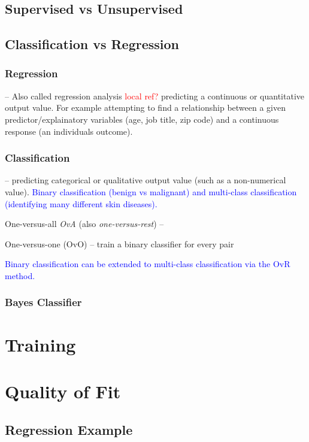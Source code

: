 \subsection{Supervised vs Unsupervised}

\subsection{Classification vs Regression}

\subsubsection{Regression} -- Also called regression analysis \textcolor{red}{local ref?} predicting a continuous or quantitative output value. For example attempting to find a relationship between a given predictor/explainatory variables (age, job title, zip code) and a continuous response (an individuals outcome).

\subsubsection{Classification} -- predicting categorical or qualitative output value (such as a non-numerical value). \textcolor{blue}{Binary classification (benign vs malignant) and multi-class classification (identifying many different skin diseases).}

One-versus-all \emph{OvA} (also \emph{one-versus-rest}) -- 

One-versus-one (OvO) -- train a binary classifier for every pair


\textcolor{blue}{Binary classification can be extended to multi-class classification via the OvR method.}

\subsubsection{Bayes Classifier}

\section{Training}

\section{Quality of Fit}


\subsection{Regression Example}

